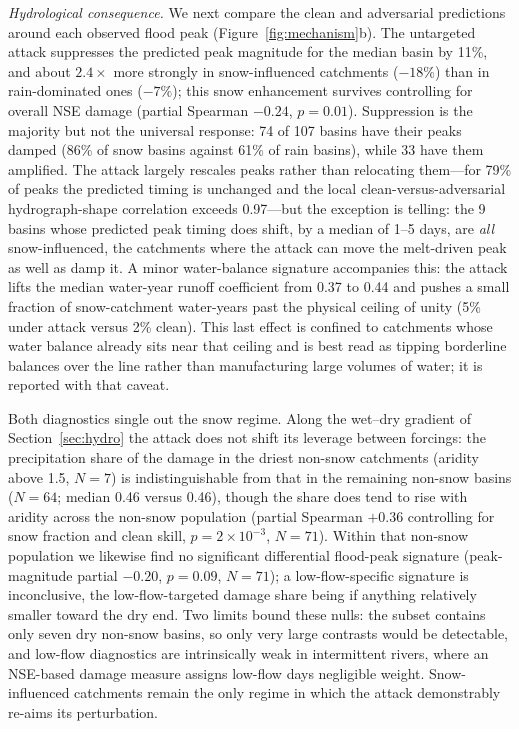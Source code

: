 \documentclass[final]{agujournal2019}
\begin{document}
\textit{Hydrological consequence.} We next compare the clean and adversarial predictions around each observed flood peak (Figure~\ref{fig:mechanism}b). The untargeted attack suppresses the predicted peak magnitude for the median basin by 11\%, and about $2.4\times$ more strongly in snow-influenced catchments ($-18\%$) than in rain-dominated ones ($-7\%$); this snow enhancement survives controlling for overall NSE damage (partial Spearman $-0.24$, $p = 0.01$). Suppression is the majority but not the universal response: 74 of 107 basins have their peaks damped (86\% of snow basins against 61\% of rain basins), while 33 have them amplified. The attack largely rescales peaks rather than relocating them---for 79\% of peaks the predicted timing is unchanged and the local clean-versus-adversarial hydrograph-shape correlation exceeds 0.97---but the exception is telling: the 9 basins whose predicted peak timing does shift, by a median of 1--5 days, are \emph{all} snow-influenced, the catchments where the attack can move the melt-driven peak as well as damp it. A minor water-balance signature accompanies this: the attack lifts the median water-year runoff coefficient from 0.37 to 0.44 and pushes a small fraction of snow-catchment water-years past the physical ceiling of unity (5\% under attack versus 2\% clean). This last effect is confined to catchments whose water balance already sits near that ceiling and is best read as tipping borderline balances over the line rather than manufacturing large volumes of water; it is reported with that caveat.

Both diagnostics single out the snow regime. Along the wet--dry gradient of Section~\ref{sec:hydro} the attack does not shift its leverage between forcings: the precipitation share of the damage in the driest non-snow catchments (aridity above 1.5, $N = 7$) is indistinguishable from that in the remaining non-snow basins ($N = 64$; median 0.46 versus 0.46), though the share does tend to rise with aridity across the non-snow population (partial Spearman $+0.36$ controlling for snow fraction and clean skill, $p = 2\times10^{-3}$, $N = 71$). Within that non-snow population we likewise find no significant differential flood-peak signature (peak-magnitude partial $-0.20$, $p = 0.09$, $N = 71$); a low-flow-specific signature is inconclusive, the low-flow-targeted damage share being if anything relatively smaller toward the dry end. Two limits bound these nulls: the subset contains only seven dry non-snow basins, so only very large contrasts would be detectable, and low-flow diagnostics are intrinsically weak in intermittent rivers, where an NSE-based damage measure assigns low-flow days negligible weight. Snow-influenced catchments remain the only regime in which the attack demonstrably re-aims its perturbation.
\end{document}
